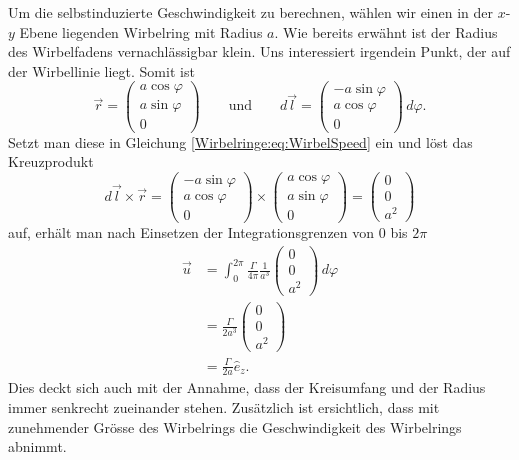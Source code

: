 Um die selbstinduzierte Geschwindigkeit zu berechnen, wählen wir einen in der \(x\)-\(y\) Ebene liegenden Wirbelring mit Radius \(a\).
Wie bereits erwähnt ist der Radius des Wirbelfadens vernachlässigbar klein.
Uns interessiert irgendein Punkt, der auf der Wirbellinie liegt.
Somit ist
\[
\vec{r} = 
\begin{pmatrix}
    a \cos \varphi\\
    a \sin \varphi\\
    0    
\end{pmatrix}
\qquad
\text{und}
\qquad
d\vec{l} = 
\begin{pmatrix}
    -a \sin \varphi\\
    a \cos \varphi\\
    0    
\end{pmatrix}
\,d\varphi .
\] 
Setzt man diese in Gleichung \eqref{Wirbelringe:eq:WirbelSpeed} ein und löst das Kreuzprodukt 
\[
d\vec{l}\times\vec{r} 
= 
\begin{pmatrix}
    -a \sin \varphi\\
    a \cos \varphi\\
    0
\end{pmatrix}
\times
\begin{pmatrix}
    a \cos \varphi\\
    a \sin \varphi\\
    0    
\end{pmatrix}
=
\begin{pmatrix}
    0\\
    0\\
    a^2
\end{pmatrix}
\]
auf, erhält man nach Einsetzen der Integrationsgrenzen von 0 bis \(2\pi\)
\begin{align*}
\vec{u}
&=
\int_{0}^{2\pi} \frac{\Gamma}{4\pi}\frac{1}{a^3}
\begin{pmatrix}
    0\\
    0\\
    a^2
\end{pmatrix}
\,d\varphi\\
&=\frac{\Gamma}{2a^3}
\begin{pmatrix}
    0\\
    0\\
    a^2
\end{pmatrix}\\
&=\frac{\Gamma}{2a}\hat{e}_z.
\end{align*}    
Dies deckt sich auch mit der Annahme, dass der Kreisumfang und der Radius immer senkrecht zueinander stehen.
Zusätzlich ist ersichtlich, dass mit zunehmender Grösse des Wirbelrings die Geschwindigkeit des Wirbelrings abnimmt.


